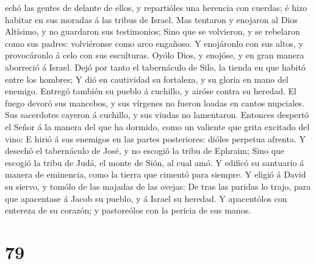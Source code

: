 echó las gentes de delante de ellos, y repartióles una herencia con
cuerdas; é hizo habitar en sus moradas á las tribus de Israel.
 Mas tentaron y enojaron al Dios Altísimo, y no guardaron
sus testimonios;  Sino que se volvieron, y se rebelaron
como sus padres: volviéronse como arco engañoso.  Y
enojáronlo con sus altos, y provocáronlo á celo con sus esculturas.
 Oyólo Dios, y enojóse, y en gran manera aborreció á
Israel.  Dejó por tanto el tabernáculo de Silo, la tienda
en que habitó entre los hombres;  Y dió en cautividad su
fortaleza, y su gloria en mano del enemigo.  Entregó
también su pueblo á cuchillo, y airóse contra su heredad.
 El fuego devoró sus mancebos, y sus vírgenes no fueron
loadas en cantos nupciales.  Sus sacerdotes cayeron á
cuchillo, y sus viudas no lamentaron.  Entonces despertó
el Señor á la manera del que ha dormido, como un valiente que grita
excitado del vino:  E hirió á sus enemigos en las partes
posteriores: dióles perpetua afrenta.  Y desechó el
tabernáculo de José, y no escogió la tribu de Ephraim; 
Sino que escogió la tribu de Judá, el monte de Sión, al cual amó.
 Y edificó su santuario á manera de eminencia, como la
tierra que cimentó para siempre.  Y eligió á David su
siervo, y tomólo de las majadas de las ovejas:  De tras
las paridas lo trajo, para que apacentase á Jacob su pueblo, y á Israel
su heredad.  Y apacentólos con entereza de su corazón; y
pastoreólos con la pericia de sus manos.

\hypertarget{section-78}{%
\section{79}\label{section-78}}

